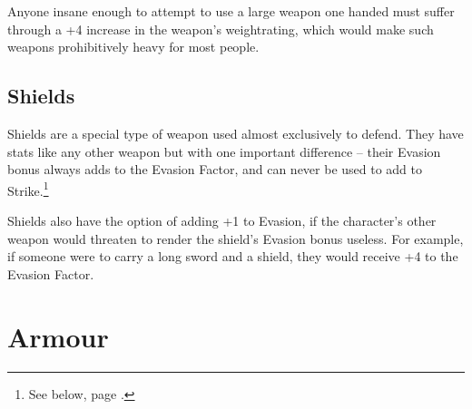 \begin{multicols}{2}
Anyone insane enough to attempt to use a large weapon one handed must suffer through a +4 increase in the weapon's \gls{weightrating}, which would make such weapons prohibitively heavy for most people.

\subsection{Shields}

Shields are a special type of weapon used almost exclusively to defend.
They have stats like any other weapon but with one important difference -- their Evasion bonus always adds to the Evasion Factor, and can never be used to add to Strike.\footnote{See below, page \pageref{stances}.}

Shields also have the option of adding +1 to Evasion, if the character's other weapon would threaten to render the shield's Evasion bonus useless.
For example, if someone were to carry a long sword and a shield, they would receive +4 to the Evasion Factor.

\end{multicols}

\newcommand{\armourchart}{

	\begin{tcolorbox}[arc=1mm,tabularx={XXXX}]

	\textbf{Armour} & \glsentrytext{dr} & \textbf{Weight} & \textbf{Price} \\\hline

	Elvish & 2 & -2 & 3 gp \\

	Padded & 2 & 1 & 1 sp \\

	Leather & 3 & 0 & 5 sp \\

	Chain & 4 & 1 & 10 sp \\

	Plate & 5 & 2 & 12 gp \\

	\end{tcolorbox}
}

\section{Armour}

